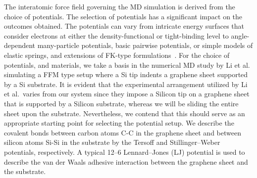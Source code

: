 



The interatomic force field governing the \acrshort{MD} simulation is derived from the choice of potentials. The selection of potentials has a significant impact on the outcomes obtained. The potentials can vary from intricate energy surfaces that consider electrons at either the density-functional or tight-binding level to angle-dependent many-particle potentials, basic pairwise potentials, or simple models of elastic springs, and extensions of \acrshort{FK}-type formulations~\cite{Vanossi_2013}. For the choice of
potentials, and materials, we take a basis in the numerical \acrshort{MD} study
by Li et al.~\cite{li_evolving_2016} simulating a \acrshort{FFM} type setup
where a Si tip indents a graphene sheet supported by a Si substrate. It is evident that the experimental arrangement utilized by Li et al.\ varies from our system since they impose a Silicon tip on a graphene sheet that is supported by a Silicon substrate, whereas we will be sliding the entire sheet upon the substrate. Nevertheless, we contend that this should serve as an appropriate starting point for selecting the potential setup. We describe the covalent bonds between carbon atoms C-C in the graphene sheet and between silicon atoms Si-Si in the substrate by the Tersoff and
Stillinger–Weber potentials, respectively. A typical 12--6 Lennard–Jones (\acrshort{LJ}) potential is used to describe the van der Waals adhesive interaction between the graphene sheet and the substrate. 



